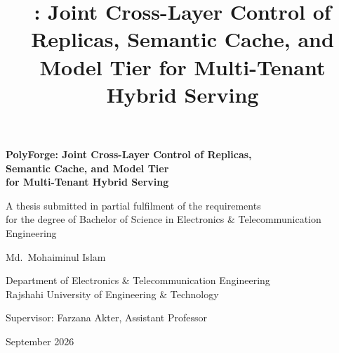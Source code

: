 \documentclass[11pt,a4paper,oneside]{report}
\title{\polyforge{}: Joint Cross-Layer Control of Replicas, Semantic Cache,
and Model Tier for Multi-Tenant Hybrid Serving}
\author{\thesisauthor}
\date{\thesisdate}
\newcommand{\thesisauthor}{Md.\ Mohaiminul Islam}
\newcommand{\thesisdegree}{Bachelor of Science in Electronics \& Telecommunication Engineering}
\newcommand{\thesisuniversity}{Rajshahi University of Engineering \& Technology}
\newcommand{\thesisdepartment}{Department of Electronics \& Telecommunication Engineering}
\newcommand{\thesissupervisor}{Farzana Akter, Assistant Professor}
\newcommand{\thesisdate}{September 2026}
\newcommand{\polyforge}{PolyForge}
\begin{document}
\begin{titlepage}
  \centering
  \vspace*{2cm}
  {\LARGE\bfseries \polyforge{}: Joint Cross-Layer Control of Replicas,\\
   Semantic Cache, and Model Tier\\
   for Multi-Tenant Hybrid Serving\par}
  \vspace{2cm}
  {\large A thesis submitted in partial fulfilment of the requirements\\
   for the degree of \thesisdegree\par}
  \vspace{2cm}
  {\Large \thesisauthor\par}
  \vspace{0.6cm}
  {\large \thesisdepartment\\ \thesisuniversity\par}
  \vspace{0.6cm}
  {\large Supervisor: \thesissupervisor\par}
  \vfill
  {\large \thesisdate\par}
\end{titlepage}
\end{document}

